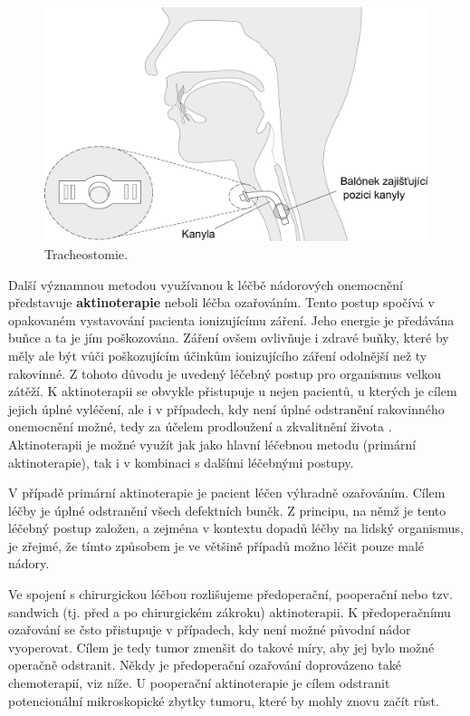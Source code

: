 \begin{figure}[htb]
  \begin{center}
    \def\svgwidth{0.9\linewidth}
    \includegraphics[width=0.9\linewidth]{ch3-cause/figures/tracheostomie}
    \caption[Tracheostomie.]{Tracheostomie.}
    \label{fig:cause:desease:tracheostomy}
  \end{center}
\end{figure}

Další významnou metodou využívanou k léčbě nádorových onemocnění představuje
\textbf{aktinoterapie} neboli léčba ozařováním. Tento postup spočívá v opakovaném vystavování pacienta ionizujícímu záření. Jeho energie je předávána buňce a ta je jím poškozována. Záření ovšem ovlivňuje i
zdravé buňky, které by měly ale být vůči poškozujícím účinkům ionizujícího záření odolnější než ty rakovinné. 
Z tohoto důvodu je uvedený léčebný postup pro organismus velkou zátěží.
K aktinoterapii se obvykle přistupuje u nejen pacientů, u kterých je cílem jejich úplné vyléčení, ale i v případech, kdy není úplné odstranění rakovinného onemocnění možné, tedy za účelem prodloužení a zkvalitnění života \cite{Slavicek2000}. Aktinoterapii je možné využít jak jako hlavní léčebnou metodu (primární
aktinoterapie), tak i v kombinaci s dalšími léčebnými postupy. 

V případě primární aktinoterapie je pacient léčen výhradně ozařováním. Cílem léčby je úplné odstranění všech defektních
buněk. Z principu, na němž je tento léčebný postup založen, a zejména v kontextu dopadů léčby na lidský organismus, je zřejmé, že tímto způsobem je ve většině případů možno léčit pouze malé nádory.

Ve spojení s chirurgickou léčbou rozlišujeme předoperační, pooperační nebo
tzv. sandwich (tj. před a po chirurgickém zákroku) aktinoterapii. 
K předoperačnímu ozařování se čsto přistupuje v případech, kdy není možné původní nádor vyoperovat.
Cílem je tedy tumor zmenšit do takové míry, aby jej bylo možné operačně
odstranit. Někdy je předoperační ozařování doprovázeno také chemoterapií, viz níže.
U pooperační aktinoterapie je cílem odstranit potencionální
mikroskopické zbytky tumoru, které by mohly znovu začít růst.


